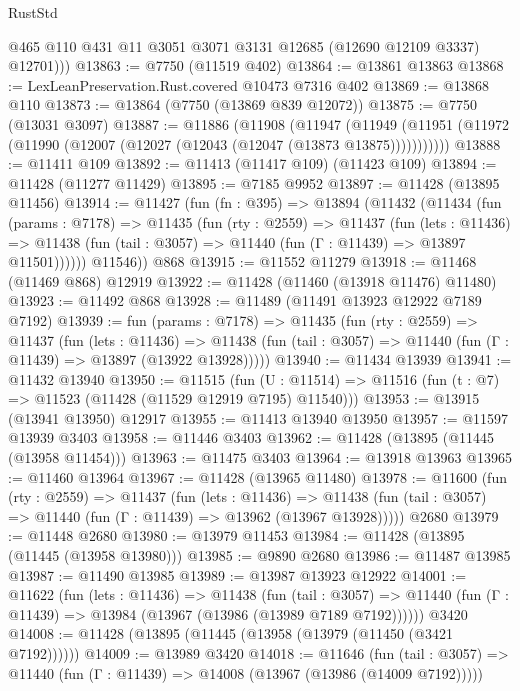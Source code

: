 \begin{lexlean}{RustStd}
\begin{coremodule}
          @465
          @110
          @431
          @11
          @3051
          @3071
          @3131
          @12685
          (@12690 @12109 @3337)
          @12701)))
@13863 := @7750 (@11519 @402)
@13864 := @13861 @13863
@13868 := LexLeanPreservation.Rust.covered @10473 @7316 @402
@13869 := @13868 @110
@13873 := @13864 (@7750 (@13869 @839 @12072))
@13875 := @7750 (@13031 @3097)
@13887 := @11886
    (@11908
      (@11947
        (@11949 (@11951 (@11972 (@11990 (@12007 (@12027 (@12043 (@12047 (@13873 @13875)))))))))))
@13888 := @11411 @109
@13892 := @11413 (@11417 @109) (@11423 @109)
@13894 := @11428 (@11277 @11429)
@13895 := @7185 @9952
@13897 := @11428 (@13895 @11456)
@13914 := @11427
    (fun (fn : @395) =>
    @13894
      (@11432
        (@11434
          (fun (params : @7178) =>
          @11435
            (fun (rty : @2559) =>
            @11437
              (fun (lets : @11436) =>
              @11438 (fun (tail : @3057) => @11440 (fun (Γ : @11439) => @13897 @11501))))))
        @11546))
    @868
@13915 := @11552 @11279
@13918 := @11468 (@11469 @868) @12919
@13922 := @11428 (@11460 (@13918 @11476) @11480)
@13923 := @11492 @868
@13928 := @11489 (@11491 @13923 @12922 @7189 @7192)
@13939 := fun (params : @7178) =>
  @11435
    (fun (rty : @2559) =>
    @11437
      (fun (lets : @11436) =>
      @11438 (fun (tail : @3057) => @11440 (fun (Γ : @11439) => @13897 (@13922 @13928)))))
@13940 := @11434 @13939
@13941 := @11432 @13940
@13950 := @11515
    (fun (U : @11514) => @11516 (fun (t : @7) => @11523 (@11428 (@11529 @12919 @7195) @11540)))
@13953 := @13915 (@13941 @13950) @12917
@13955 := @11413 @13940 @13950
@13957 := @11597 @13939 @3403
@13958 := @11446 @3403
@13962 := @11428 (@13895 (@11445 (@13958 @11454)))
@13963 := @11475 @3403
@13964 := @13918 @13963
@13965 := @11460 @13964
@13967 := @11428 (@13965 @11480)
@13978 := @11600
    (fun (rty : @2559) =>
    @11437
      (fun (lets : @11436) =>
      @11438 (fun (tail : @3057) => @11440 (fun (Γ : @11439) => @13962 (@13967 @13928)))))
    @2680
@13979 := @11448 @2680
@13980 := @13979 @11453
@13984 := @11428 (@13895 (@11445 (@13958 @13980)))
@13985 := @9890 @2680
@13986 := @11487 @13985
@13987 := @11490 @13985
@13989 := @13987 @13923 @12922
@14001 := @11622
    (fun (lets : @11436) =>
    @11438
      (fun (tail : @3057) =>
      @11440 (fun (Γ : @11439) => @13984 (@13967 (@13986 (@13989 @7189 @7192))))))
    @3420
@14008 := @11428 (@13895 (@11445 (@13958 (@13979 (@11450 (@3421 @7192))))))
@14009 := @13989 @3420
@14018 := @11646
    (fun (tail : @3057) => @11440 (fun (Γ : @11439) => @14008 (@13967 (@13986 (@14009 @7192)))))

\end{coremodule}
\end{lexlean}
